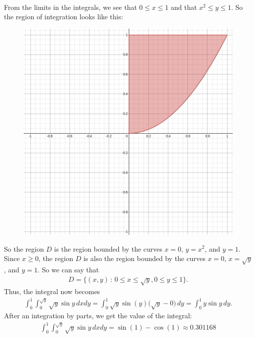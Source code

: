 	\\
	From the limits in the integrals, we see that $0 \leq x \leq 1$ and that $x^2 \leq y \leq 1$. So the region of integration looks like this:
		\begin{figure}[h]
		\centering
		\includegraphics[scale=0.3]{exo-HW02.png}
		\end{figure}
	So the region $D$ is the region bounded by the curves $x = 0$, $y = x^2$, and $y= 1$. Since $x \geq 0$, the region $D$ is also the region bounded by the curves $x = 0$, $x = \sqrt{y}$, and $y = 1$. So we can say that
		\begin{align*}
		D = \{ (x, y) \, : \, 0 \leq x \leq \sqrt{y} , 0 \leq y \leq 1 \} .
		\end{align*}	
	Thus, the integral now becomes
		\begin{align*}
		\int_0^1 \int_0^{\sqrt{y}} \sqrt{y} \sin y \, dx dy = \int_0^1 \sqrt{y} \sin (y) \Big( \sqrt{y} - 0 \Big) \, dy = \int_0^1 y \sin y \, dy .
		\end{align*}	
	After an integration by parts, we get the value of the integral:
		\begin{align*}
		\int_0^1 \int_0^{\sqrt{y}} \sqrt{y} \sin y \, dx dy = \sin (1) - \cos (1) \approx 0.301168
		\end{align*}			

